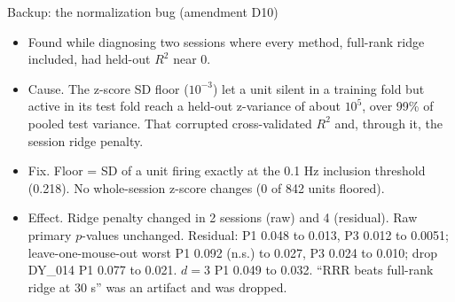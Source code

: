 \documentclass[aspectratio=169,11pt]{beamer}
\newcommand{\Rsq}{$R^2$}
\begin{document}
\begin{frame}{Backup: the normalization bug (amendment D10)}
\small
\begin{itemize}\setlength{\itemsep}{5pt}
\item Found while diagnosing two sessions where every method, full-rank ridge included, had held-out
\Rsq{} near 0.
\item Cause. The z-score SD floor ($10^{-3}$) let a unit silent in a training fold but active in its test fold
reach a held-out z-variance of about $10^{5}$, over 99\% of pooled test variance. That corrupted cross-validated
\Rsq{} and, through it, the session ridge penalty.
\item Fix. Floor = SD of a unit firing exactly at the 0.1 Hz inclusion threshold (0.218). No whole-session
z-score changes (0 of 842 units floored).
\item Effect. Ridge penalty changed in 2 sessions (raw) and 4 (residual). Raw primary $p$-values unchanged.
Residual: P1 0.048 to 0.013, P3 0.012 to 0.0051; leave-one-mouse-out worst P1 0.092 (n.s.) to 0.027, P3 0.024
to 0.010; drop DY\_014 P1 0.077 to 0.021. $d = 3$ P1 0.049 to 0.032. ``RRR beats full-rank ridge at 30 s'' was an artifact and was dropped.
\end{itemize}
\end{frame}
\end{document}
